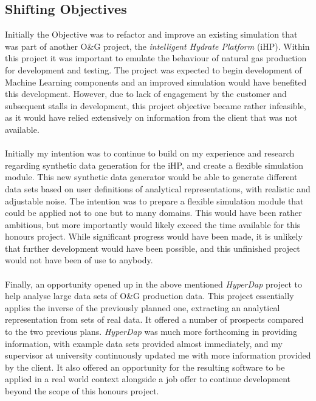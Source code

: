 \documentclass[main.tex]{subfiles}
\begin{document}
    \subsection{Shifting Objectives}
  
      Initially the Objective was to refactor and improve an existing simulation that was part of another O\&G  project, the \textit{intelligent Hydrate Platform} (iHP). Within this project it was important to emulate the behaviour of natural gas production for development and testing. The project was expected to begin development of Machine Learning components and an improved simulation would have benefited this development. However, due to lack of engagement by the customer and subsequent stalls in development, this project objective became rather infeasible, as it would have relied extensively on information from the client that was not available.
      \\\\
      Initially my intention was to continue to build on my experience and research regarding synthetic data generation for the iHP, and create a flexible simulation module. This new synthetic data generator would be able to generate different data sets based on user definitions of analytical representations, with realistic and adjustable noise. The intention was to prepare a flexible simulation module that could be applied not to one but to many domains. This would have been rather ambitious, but more importantly would likely exceed the time available for this honours project. While significant progress would have been made, it is unlikely that further development would have been possible, and this unfinished project would not have been of use to anybody.
      \\\\
      Finally, an opportunity opened up in the above mentioned \textit{HyperDap} project to help analyse large data sets of O\&G production data. This project essentially applies the inverse of the previously planned one, extracting an analytical representation from sets of real data. It  offered a number of prospects compared to the two previous plans. \textit{HyperDap} was much more forthcoming in providing information, with example data sets provided almost immediately, and my supervisor at university continuously updated me with more information provided by the client. It also offered an opportunity for the resulting software to be applied in a real world context alongside a job offer to continue development beyond the scope of this honours project.
    
\end{document}
